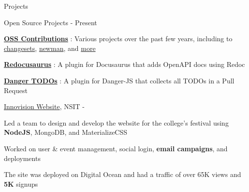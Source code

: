\documentclass[../resume.tex]{subfiles}
\begin{document}
\begin{rSection}{Projects}

\begin{rSubsection}
    {Open Source Projects}
    {  - Present}
    {}{}

    \item \href{https://rohit.page/contributions/?utm_source=resume&utm_medium=projects&utm_campaign=oss}{\textbf{OSS Contributions}}
        : Various projects over the past few years, including to 
        \href{https://rohit.page/contributions/?utm_source=resume&utm_medium=projects&utm_campaign=oss#oss-changesets/changesets}{changesets},
        \href{https://rohit.page/contributions/?utm_source=resume&utm_medium=projects&utm_campaign=newman#oss-postmanlabs/newman}{newman},
        and \href{https://rohit.page/contributions/?utm_source=resume&utm_medium=projects&utm_campaign=oss}{more}
    \item \href{https://rohit.page/blog/projects/openapi-for-docusaurus/?utm_source=resume&utm_medium=projects&utm_campaign=redocusaurus}{\textbf{Redocusaurus}}
        : A plugin for Docusaurus that adds OpenAPI docs using Redoc
    \item \href{https://rohit.page/blog/projects/dangerjs-plugin-todos/?utm_source=resume&utm_medium=projects&utm_campaign=danger}{\textbf{Danger TODOs}}
        : A plugin for Danger-JS that collects all TODOs in a Pull Request

\end{rSubsection}

\begin{rSubsection}
    {\href{https://go.rohit.page/inno}{Innovision Website}, {\nem NSIT}}
    {  -  }
    {}{}

    \item Led a team to design and develop the website for the college's festival using \textbf{NodeJS}, MongoDB, and MaterializeCSS
    \item Worked on user \& event management, social login, \textbf{email campaigns}, and deployments
    \item The site was deployed on Digital Ocean and had a traffic of over 65K views and \textbf{5K} signups


\end{rSubsection}
\end{rSection}
\end{document}
